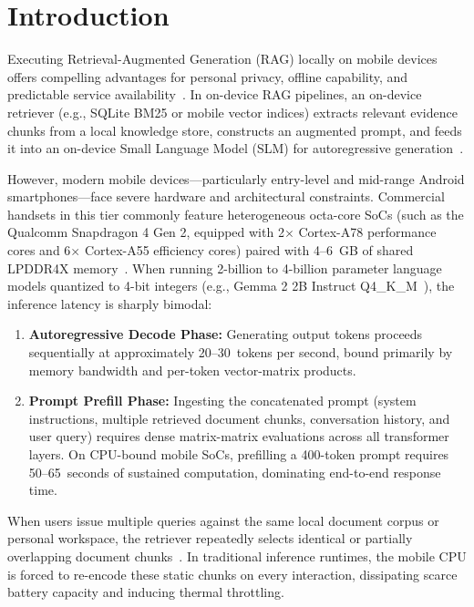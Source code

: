 \section{Introduction}
\label{sec:intro}

Executing Retrieval-Augmented Generation (RAG) locally on mobile devices offers compelling advantages for personal privacy, offline capability, and predictable service availability~\cite{lewis2020retrieval,wu2024mobilellm}. In on-device RAG pipelines, an on-device retriever (e.g., SQLite BM25 or mobile vector indices) extracts relevant evidence chunks from a local knowledge store, constructs an augmented prompt, and feeds it into an on-device Small Language Model (SLM) for autoregressive generation~\cite{guu2020realm,liu2026percache}.

However, modern mobile devices—particularly entry-level and mid-range Android smartphones—face severe hardware and architectural constraints. Commercial handsets in this tier commonly feature heterogeneous octa-core SoCs (such as the Qualcomm Snapdragon 4 Gen 2, equipped with 2$\times$ Cortex-A78 performance cores and 6$\times$ Cortex-A55 efficiency cores) paired with 4--6~GB of shared LPDDR4X memory~\cite{reddi2021mlperfmobile}. When running 2-billion to 4-billion parameter language models quantized to 4-bit integers (e.g., Gemma 2 2B Instruct Q4\_K\_M~\cite{gemma2024gemma2}), the inference latency is sharply bimodal:
\begin{enumerate}
    \item \textbf{Autoregressive Decode Phase:} Generating output tokens proceeds sequentially at approximately 20--30~tokens per second, bound primarily by memory bandwidth and per-token vector-matrix products.
    \item \textbf{Prompt Prefill Phase:} Ingesting the concatenated prompt (system instructions, multiple retrieved document chunks, conversation history, and user query) requires dense matrix-matrix evaluations across all transformer layers. On CPU-bound mobile SoCs, prefilling a 400-token prompt requires 50--65~seconds of sustained computation, dominating end-to-end response time.
\end{enumerate}

When users issue multiple queries against the same local document corpus or personal workspace, the retriever repeatedly selects identical or partially overlapping document chunks~\cite{lu2024turborag,liu2026percache}. In traditional inference runtimes, the mobile CPU is forced to re-encode these static chunks on every interaction, dissipating scarce battery capacity and inducing thermal throttling.

